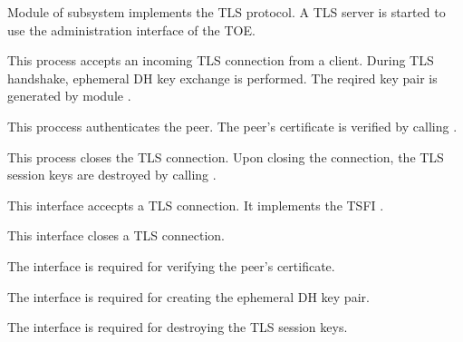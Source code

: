 



Module  of subsystem  implements the TLS
protocol. A TLS server is started to use the administration interface of the
TOE.



This process accepts an incoming TLS connection from a client. During TLS
handshake, ephemeral DH key exchange is performed. The reqired key pair is
generated by module .



This proccess authenticates the peer. The peer's certificate is verified by
calling .



This process closes the TLS connection. Upon closing the connection, the TLS
session keys are destroyed by calling
.




This interface accecpts a TLS connection. It implements the TSFI \lslantls{}.


This interface closes a TLS connection.


The interface  is required for verifying the
peer's certificate.


The interface  is required for
creating the ephemeral DH key pair.


The interface  is required for
destroying the TLS session keys.






